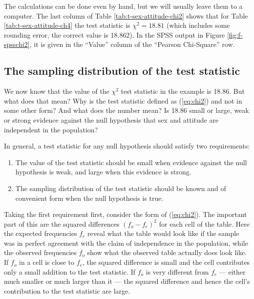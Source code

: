 \documentclass[11pt,a4paper,openany]{book}
\begin{document}
The calculations can be done even by hand, but we will usually leave
them to a computer. The last column of Table
\ref{tab:t-sex-attitude-chi2} shows that for Table
\ref{tab:t-sex-attitude-ch4} the test statistic is \(\chi^{2}=18.81\)
(which includes some rounding error, the correct value is 18.862). In
the SPSS output in Figure \ref{fig:f-spsschi2}, it is given in the
``Value'' column of the ``Pearson Chi-Square'' row.

\subsection{The sampling distribution of the test
statistic}\label{ss-tables-chi2test-sdist}

We now know that the value of the \(\chi^{2}\) test statistic in the
example is 18.86. But what does that mean? Why is the test statistic
defined as (\ref{eq:chi2}) and not in some other form? And what does the
number mean? Is 18.86 small or large, weak or strong evidence against
the null hypothesis that sex and attitude are independent in the
population?

In general, a test statistic for any null hypothesis should satisfy two
requirements:

\begin{enumerate}
\def\labelenumi{\arabic{enumi}.}
\item
  The value of the test statistic should be small when evidence against
  the null hypothesis is weak, and large when this evidence is strong.
\item
  The sampling distribution of the test statistic should be known and of
  convenient form when the null hypothesis is true.
\end{enumerate}

Taking the first requirement first, consider the form of
(\ref{eq:chi2}). The important part of this are the squared differences
\((f_{o}-f_{e})^{2}\) for each cell of the table. Here the expected
frequencies \(f_{e}\) reveal what the table would look like if the
sample was in perfect agreement with the claim of independence in the
population, while the observed frequencies \(f_{o}\) show what the
observed table actually does look like. If \(f_{o}\) in a cell is close
to \(f_{e}\), the squared difference is small and the cell contributes
only a small addition to the test statistic. If \(f_{o}\) is very
different from \(f_{e}\) --- either much smaller or much larger than it
--- the squared difference and hence the cell's contribution to the test
statistic are large.
\end{document}
